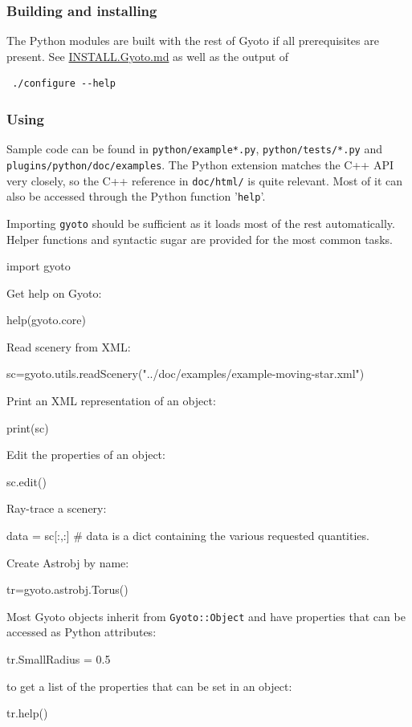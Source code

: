 \documentclass[a4paper,12pt]{article}
\begin{document}
\subsubsection{Building and installing}

The Python modules are built with the rest of Gyoto if all
prerequisites are present. See
\href{https://github.com/gyoto/Gyoto/blob/master/INSTALL.Gyoto.md}{INSTALL.Gyoto.md}
as well as the output of
\begin{verbatim}
 ./configure --help
\end{verbatim}

\subsubsection{Using}

Sample code can be found in \texttt{python/example*.py},
\texttt{python/tests/*.py} and
\\ \texttt{plugins/python/doc/examples}. The Python extension matches
the C++ API very closely, so the C++ reference in \texttt{doc/html/}
is quite relevant. Most of it can also be accessed through the Python
function '\texttt{help}'.

Importing \texttt{gyoto} should be sufficient as it loads most of the
rest automatically. Helper functions and syntactic sugar are provided
for the most common tasks.
\begin{code}
  import gyoto
\end{code}
Get help on Gyoto:
\begin{code}
  help(gyoto.core)
\end{code}
Read scenery from XML:
\begin{code}
  sc=gyoto.utils.readScenery("../doc/examples/example-moving-star.xml")
\end{code}

Print an XML representation of an object:
\begin{code}
  print(sc)
\end{code}
Edit the properties of an object:
\begin{code}
  sc.edit()
\end{code}
Ray-trace a scenery:
\begin{code}
  data = sc[:,:] # data is a dict containing the various requested quantities.
\end{code}

Create Astrobj by name:
\begin{code}
  tr=gyoto.astrobj.Torus()
\end{code}
Most Gyoto objects inherit from \texttt{Gyoto::Object} and have
properties that can be accessed as Python attributes:
\begin{code}
  tr.SmallRadius = 0.5
\end{code}
to get a list of the properties that can be set in an object:
\begin{code}
  tr.help()
\end{code}
\end{document}
